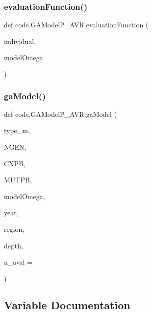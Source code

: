 \subsubsection{\texorpdfstring{evaluation\+Function()}{evaluationFunction()}}
{\footnotesize\ttfamily def code.\+G\+A\+Model\+P\+\_\+\+A\+V\+R.\+evaluation\+Function (\begin{DoxyParamCaption}\item[{}]{individual,  }\item[{}]{model\+Omega }\end{DoxyParamCaption})}

\mbox{\label{namespacecode_1_1_g_a_model_p___a_v_r_a922bf40c33ff02ee40ad28ccb7122b83}} 
\subsubsection{\texorpdfstring{ga\+Model()}{gaModel()}}
{\footnotesize\ttfamily def code.\+G\+A\+Model\+P\+\_\+\+A\+V\+R.\+ga\+Model (\begin{DoxyParamCaption}\item[{}]{type\+\_\+m,  }\item[{}]{N\+G\+EN,  }\item[{}]{C\+X\+PB,  }\item[{}]{M\+U\+T\+PB,  }\item[{}]{model\+Omega,  }\item[{}]{year,  }\item[{}]{region,  }\item[{}]{depth,  }\item[{}]{n\+\_\+aval = {} }\end{DoxyParamCaption})}



\subsection{Variable Documentation}
\mbox{\label{namespacecode_1_1_g_a_model_p___a_v_r_a6464be2da11db3ebe3986118deaa9be5}} 
